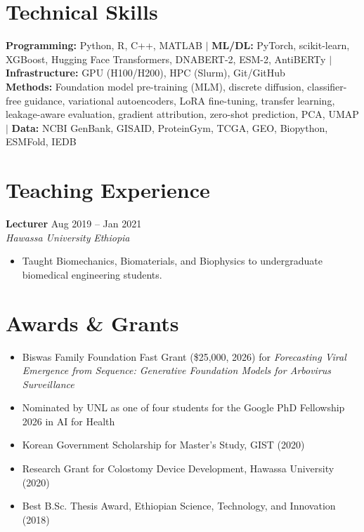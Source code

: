\documentclass[10pt,a4paper]{article}
\newcommand{\entry}[4]{%
  \textbf{#1} \hfill #2 \\
  \textit{#3} \hfill \textit{#4} \\[1pt]
}
\begin{document}
\section{Technical Skills}

\textbf{Programming:} Python, R, C++, MATLAB \quad $|$ \quad \textbf{ML/DL:} PyTorch, scikit-learn, XGBoost, Hugging Face Transformers, DNABERT-2, ESM-2, AntiBERTy \quad $|$ \quad \textbf{Infrastructure:} GPU (H100/H200), HPC (Slurm), Git/GitHub \\[3pt]
\textbf{Methods:} Foundation model pre-training (MLM), discrete diffusion, classifier-free guidance, variational autoencoders, LoRA fine-tuning, transfer learning, leakage-aware evaluation, gradient attribution, zero-shot prediction, PCA, UMAP \quad $|$ \quad \textbf{Data:} NCBI GenBank, GISAID, ProteinGym, TCGA, GEO, Biopython, ESMFold, IEDB

\section{Teaching Experience}

\entry{Lecturer}{Aug 2019 -- Jan 2021}
{Hawassa University}{Ethiopia}
\begin{itemize}[leftmargin=1.2em, topsep=0pt, itemsep=1pt, parsep=0pt]
  \item Taught Biomechanics, Biomaterials, and Biophysics to undergraduate biomedical engineering students.
\end{itemize}

\section{Awards \& Grants}

\begin{itemize}[leftmargin=1.2em, topsep=2pt, itemsep=2pt, parsep=0pt]
  \item Biswas Family Foundation Fast Grant (\$25,000, 2026) for \textit{Forecasting Viral Emergence from Sequence: Generative Foundation Models for Arbovirus Surveillance}
  \item Nominated by UNL as one of four students for the Google PhD Fellowship 2026 in AI for Health
  \item Korean Government Scholarship for Master's Study, GIST (2020)
  \item Research Grant for Colostomy Device Development, Hawassa University (2020)
  \item Best B.Sc. Thesis Award, Ethiopian Science, Technology, and Innovation (2018)
\end{itemize}
\end{document}
